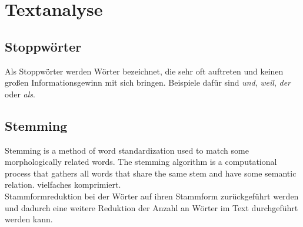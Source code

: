 \section{Textanalyse}
	\subsection{Stoppwörter}
	Als Stoppwörter werden Wörter bezeichnet, die sehr oft auftreten und keinen großen Informationsgewinn mit sich bringen. Beispiele dafür sind \textit{und}, \textit{weil}, \textit{der} oder \textit{als}.\cite{Stopwords} \\
	\subsection{Stemming}
	Stemming is a method of  word standardization used to match some morphologically related words. The stemming algorithm is a computational  process that gathers all words that share the same stem and have some semantic relation. \cite{eldesouki2009stemming}
	vielfaches komprimiert.\\
	Stammformreduktion bei der Wörter auf ihren Stammform zurückgeführt werden und dadurch eine weitere Reduktion der Anzahl an Wörter im Text durchgeführt werden kann.

